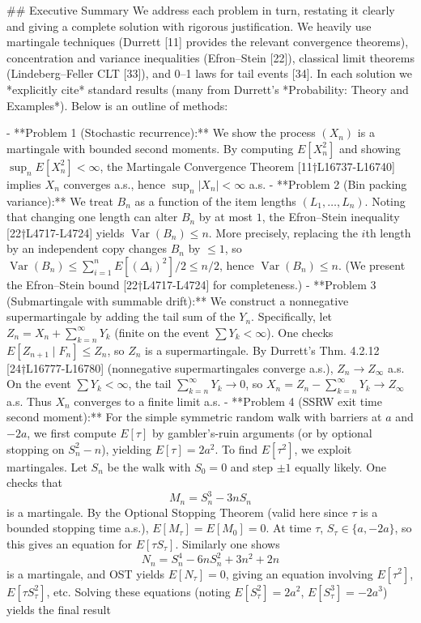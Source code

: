 \documentclass[11pt]{article}
\DeclareMathOperator{\Var}{Var}
\begin{document}
\#\# Executive Summary
We address each problem in turn, restating it clearly and giving a complete solution with rigorous justification. We heavily use martingale techniques (Durrett [11] provides the relevant convergence theorems), concentration and variance inequalities (Efron–Stein [22]), classical limit theorems (Lindeberg–Feller CLT [33]), and 0–1 laws for tail events [34]. In each solution we *explicitly cite* standard results (many from Durrett’s *Probability: Theory and Examples*). Below is an outline of methods:

- **Problem 1 (Stochastic recurrence):** We show the process $(X_n)$ is a martingale with bounded second moments. By computing $E[X_n^2]$ and showing $\sup_n E[X_n^2]<\infty$, the Martingale Convergence Theorem [11†L16737-L16740] implies $X_n$ converges a.s., hence $\sup_n|X_n|<\infty$ a.s.
- **Problem 2 (Bin packing variance):** We treat $B_n$ as a function of the item lengths $(L_1,\dots,L_n)$. Noting that changing one length can alter $B_n$ by at most $1$, the Efron–Stein inequality [22†L4717-L4724] yields $\Var(B_n)\le n$. More precisely, replacing the $i$th length by an independent copy changes $B_n$ by $\le1$, so $\Var(B_n)\le \sum_{i=1}^n E[(\Delta_i)^2]/2 \le n/2$, hence $\Var(B_n)\le n$. (We present the Efron–Stein bound [22†L4717-L4724] for completeness.)
- **Problem 3 (Submartingale with summable drift):** We construct a nonnegative supermartingale by adding the tail sum of the $Y_n$. Specifically, let $Z_n = X_n + \sum_{k=n}^\infty Y_k$ (finite on the event $\sum Y_k<\infty$). One checks $E[Z_{n+1}\mid F_n] \le Z_n$, so $Z_n$ is a supermartingale. By Durrett’s Thm. 4.2.12 [24†L16777-L16780] (nonnegative supermartingales converge a.s.), $Z_n\to Z_\infty$ a.s. On the event $\sum Y_k<\infty$, the tail $\sum_{k=n}^\infty Y_k\to0$, so $X_n=Z_n-\sum_{k=n}^\infty Y_k\to Z_\infty$ a.s. Thus $X_n$ converges to a finite limit a.s.
- **Problem 4 (SSRW exit time second moment):** For the simple symmetric random walk with barriers at $a$ and $-2a$, we first compute $E[\tau]$ by gambler’s-ruin arguments (or by optional stopping on $S_n^2-n$), yielding $E[\tau]=2a^2$. To find $E[\tau^2]$, we exploit martingales. Let $S_n$ be the walk with $S_0=0$ and step $\pm1$ equally likely. One checks that
$$M_n = S_n^3 - 3nS_n$$
is a martingale. By the Optional Stopping Theorem (valid here since $\tau$ is a bounded stopping time a.s.), $E[M_\tau]=E[M_0]=0$. At time $\tau$, $S_\tau\in\{a,-2a\}$, so this gives an equation for $E[\tau S_\tau]$. Similarly one shows
$$N_n = S_n^4 - 6n S_n^2 + 3n^2 +2n$$
is a martingale, and OST yields $E[N_\tau]=0$, giving an equation involving $E[\tau^2]$, $E[\tau S_\tau^2]$, etc. Solving these equations (noting $E[S_\tau^2]=2a^2$, $E[S_\tau^3]=-2a^3$) yields the final result
\end{document}
